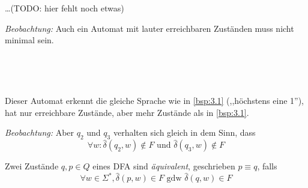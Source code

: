 \ldots (TODO: hier fehlt noch etwas)

\emph{Beobachtung:} Auch ein Automat mit lauter erreichbaren Zuständen muss nicht minimal sein.
\begin{Bsp}\label{Bsp:3.4}\
  \begin{center}
                \\
              \end{center}
        Dieser Automat erkennt die gleiche Sprache wie in \eqref{bsp:3.1} (,,höchstens eine 1''), hat nur erreichbare Zustände, aber mehr Zustände als in \eqref{bsp:3.1}.
        
        \emph{Beobachtung:} Aber $q_2$ und $q_3$ verhalten sich gleich in dem Sinn, dass
        \[ \forall w: \hat\delta(q_2,w) \notin F\text{ und }\hat\delta(q_3,w)\notin F \]
\end{Bsp}
%
%
\begin{Def}[name={[Äquivalenz von \acs*{DFA}-Zuständen]}] %
  Zwei Zustände $q,p\in Q$ eines \ac{DFA} sind \emph{äquivalent}, geschrieben $p\equiv q$, falls
  \begin{displaymath}
  \forall w\in\Sigma^*, \hat\delta(p,w)\in F \text{ gdw } \hat\delta(q,w)\in F
\end{displaymath}
\end{Def}

